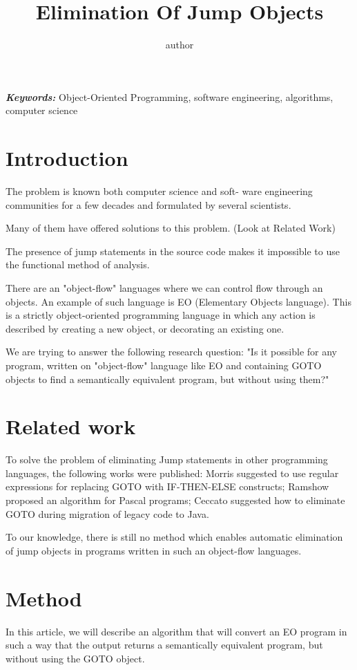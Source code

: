 \documentclass[sigplan,review,11pt,nonacm,natbib=false]{acmart}
\title{Elimination Of Jump Objects}
\author{author}
\providecommand{\keywords}[1]
{
  \small
  \textbf{\textit{Keywords:}} #1
}
\begin{document}
\maketitle


\keywords{Object-Oriented Programming, software engineering, algorithms, computer science}

\section{Introduction}
The problem is known both computer science and soft-
ware engineering communities for a few decades and formulated by several scientists.

Many of them have offered solutions to this problem. (Look at Related Work)

The presence of jump statements in the source code makes it impossible to use the functional method of analysis.

There are an "object-flow" languages where we can control flow through an objects. An example of such language is EO (Elementary Objects language). This is a strictly object-oriented programming language in which any action is described by creating a new object, or decorating an existing one.

We are trying to answer the following research question: "Is it possible for any program, written on "object-flow" language like EO and containing GOTO objects to find a semantically equivalent program, but without using them?"

\section{Related work}
To solve the problem of eliminating Jump statements in other programming languages, the following works were published:
Morris suggested to use regular expressions for replacing GOTO with IF-THEN-ELSE constructs;
Ramshow proposed an algorithm for Pascal programs;
Ceccato suggested how to eliminate GOTO during migration of legacy code to Java.

To our knowledge, there is still no method which enables automatic elimination of jump objects in programs written in such an object-flow languages.

\section{Method}
In this article, we will describe an algorithm that will convert an EO program in such a way that the output returns a semantically equivalent program, but without using the GOTO object.
\end{document}
